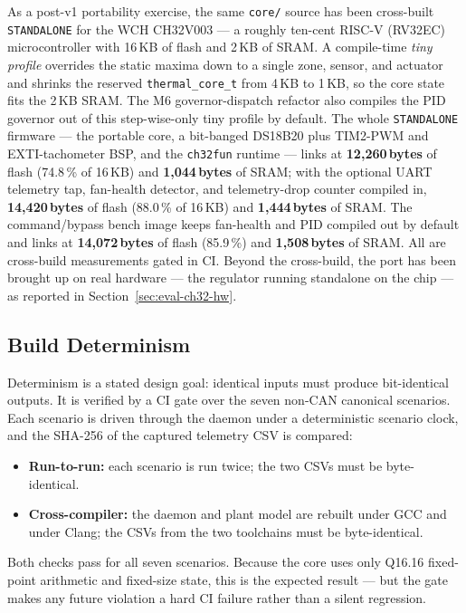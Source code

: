 As a post-v1 portability exercise, the same \texttt{core/} source has been cross-built \texttt{STANDALONE} for the WCH CH32V003 --- a roughly ten-cent RISC-V (RV32EC) microcontroller with 16\,KB of flash and 2\,KB of SRAM. A compile-time \emph{tiny profile} overrides the static maxima down to a single zone, sensor, and actuator and shrinks the reserved \texttt{thermal\_core\_t} from 4\,KB to 1\,KB, so the core state fits the 2\,KB SRAM. The M6 governor-dispatch refactor also compiles the PID governor out of this step-wise-only tiny profile by default. The whole \texttt{STANDALONE} firmware --- the portable core, a bit-banged DS18B20 plus TIM2-PWM and EXTI-tachometer BSP, and the \texttt{ch32fun} runtime --- links at \textbf{12{,}260\,bytes} of flash (74.8\,\% of 16\,KB) and \textbf{1{,}044\,bytes} of SRAM; with the optional UART telemetry tap, fan-health detector, and telemetry-drop counter compiled in, \textbf{14{,}420\,bytes} of flash (88.0\,\% of 16\,KB) and \textbf{1{,}444\,bytes} of SRAM. The command/bypass bench image keeps fan-health and PID compiled out by default and links at \textbf{14{,}072\,bytes} of flash (85.9\,\%) and \textbf{1{,}508\,bytes} of SRAM. All are cross-build measurements gated in CI. Beyond the cross-build, the port has been brought up on real hardware --- the regulator running standalone on the chip --- as reported in Section~\ref{sec:eval-ch32-hw}.

\subsection{Build Determinism}

Determinism is a stated design goal: identical inputs must produce bit-identical outputs. It is verified by a CI gate over the seven non-CAN canonical scenarios. Each scenario is driven through the daemon under a deterministic scenario clock, and the SHA-256 of the captured telemetry CSV is compared:

\begin{itemize}[leftmargin=*]
    \item \textbf{Run-to-run:} each scenario is run twice; the two CSVs must be byte-identical.
    \item \textbf{Cross-compiler:} the daemon and plant model are rebuilt under GCC and under Clang; the CSVs from the two toolchains must be byte-identical.
\end{itemize}

Both checks pass for all seven scenarios. Because the core uses only Q16.16 fixed-point arithmetic and fixed-size state, this is the expected result --- but the gate makes any future violation a hard CI failure rather than a silent regression.

